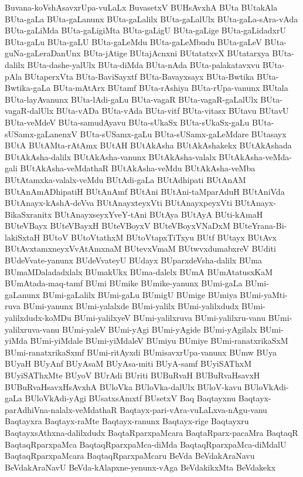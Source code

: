 {Buvana-koVshAsavxrUpa-vuLaLx
BuvasetxV
BUHsAvxhA
BUta
BUtakAla
BUta-gaLa
BUta-gaLanunx
BUta-gaLalilx
BUta-gaLalUlx
BUta-gaLa-sAra-vAda
BUta-gaLiMda
BUta-gaLigiMta
BUta-gaLigU
BUta-gaLige
BUta-gaLidadxrU
BUta-gaLu
BUta-gaLU
BUta-gaLeMdu
BUta-gaLeMbudu
BUta-gaLeV
BUta-guNa-gaLeraDanUnx
BUta-jAtige
BUtajAcnxni
BUtatatxvX
BUtatarxya
BUta-dalilx
BUta-dashe-yalUlx
BUta-diMda
BUta-nAda
BUta-palakatavxvu
BUta-pAla
BUtaperxVta
BUta-BaviSayxtf
BUta-Bavayxsayx
BUta-Bwtika
BUta-Bwtika-gaLa
BUta-mAtArx
BUtamf
BUta-rAshiya
BUta-rUpa-vanunx
BUtala
BUta-layAvanunx
BUta-lAdi-gaLu
BUta-vagaR
BUta-vagaR-gaLalUlx
BUta-vagaR-dalUlx
BUta-vADa
BUta-vAda
BUta-vitf
BUta-vitasx
BUtavu
BUtavU
BUta-veMdeV
BUta-samudAyavu
BUta-sUkaSx
BUta-sUkaSx-gaLu
BUta-sUSamx-gaLanenxV
BUta-sUSamx-gaLu
BUta-sUSamx-gaLeMdare
BUtasayx
BUtA
BUtAMta-rAtAmx
BUtAH
BUtAkAsha
BUtAkAshakekx
BUtAkAshada
BUtAkAsha-dalilx
BUtAkAsha-vanunx
BUtAkAsha-valalx
BUtAkAsha-veMda-gali
BUtAkAsha-veMdathaR
BUtAkAsha-veMdu
BUtAkAsha-veMba
BUtAtamxka-valalx-veMdu
BUtAdi-gaLa
BUtAdhipati
BUtAnAM
BUtAnAmADhipatiH
BUtAnAmf
BUtAni
BUtAni-taMparAduH
BUtAniVda
BUtAnayx-kAshA-deVva
BUtAnayxteyxVti
BUtAnayxpeyxVti
BUtAnayx-BikaSxranitx
BUtAnayxseyxYveY-tAni
BUtAya
BUtAyA
BUti-kAmaH
BUteVBayx
BUteVBayxH
BUteVBoyxV
BUteVBoyxVNaDxM
BUteYrana-Bi-lakiSxtaH
BUtoV
BUtoVtathxM
BUtoVtapxTiTxyu
BUtf
BUtayx
BUtAvx
BUtAvxtamxneyxVvAtAmxnaM
BUtevxVmaM
BUtwvxdumabxreV
BUditi
BUdeVvate-yanunx
BUdeVvateyU
BUdayx
BUparxdeVsha-dalilx
BUma
BUmaMDaladadxlalx
BUmakUkx
BUma-dalelx
BUmA
BUmAtatusxKaM
BUmAtada-maq-tamf
BUmi
BUmike
BUmike-yanunx
BUmi-gaLa
BUmi-gaLanunx
BUmi-gaLalilx
BUmi-gaLu
BUmigU
BUmige
BUmiya
BUmi-yaMti-ruva
BUmi-yanunx
BUmi-yalalxde
BUmi-yalilx
BUmi-yalilxdudx
BUmi-yalilxdudx-koMDu
BUmi-yalilxyeV
BUmi-yalilxruva
BUmi-yalilxru-vanu
BUmi-yalilxruva-vanu
BUmi-yaleV
BUmi-yAgi
BUmi-yAgide
BUmi-yAgilalx
BUmi-yiMda
BUmi-yiMdale
BUmi-yiMdaleV
BUmiyu
BUmiye
BUmi-ranatxrikaSxM
BUmi-ranatxrikaSxmf
BUmi-ritAyxdi
BUmisavxrUpa-vanunx
BUmw
BUya
BUyaH
BUyAnf
BUyAsaM
BUyAsa-miti
BUyA-samf
BUyiSAThxM
BUyiSAThxMte
BUyoV
BUrAdi
BUriti
BUBuRvaH
BUBuRvaHsavxH
BUBuRvaHsavxHsAvxhA
BUloVka
BUloVka-dalUlx
BUloV-kavu
BUloVkAdi-gaLa
BUloVkAdi-yAgi
BUsatxsAmxtf
BUsetxV
Baq
Baqtayxnu
Baqtayx-parAdhiVna-nalalx-veMdathaR
Baqtayx-pari-vAra-vuLaLxva-nAgu-vanu
Baqtayxra
Baqtayx-raMte
Baqtayx-ranunx
Baqtayx-rige
Baqtayxru
BaqtayxsAthxna-dalilxdudx
BaqtaRparxpaMcara
BaqtaRparx-pacaMra
BaqtaqR
BaqtaqRparxpaMca
BaqtaqRparxpaMca-diMda
BaqtaqRparxpaMca-diMdalU
BaqtaqRparxpaMcara
BaqtaqRparxpaMcaru
BeVda
BeVdakAraNavu
BeVdakAraNavU
BeVda-kAlapxne-yenunx-vAga
BeVdakikxMta
BeVdakekx
}
